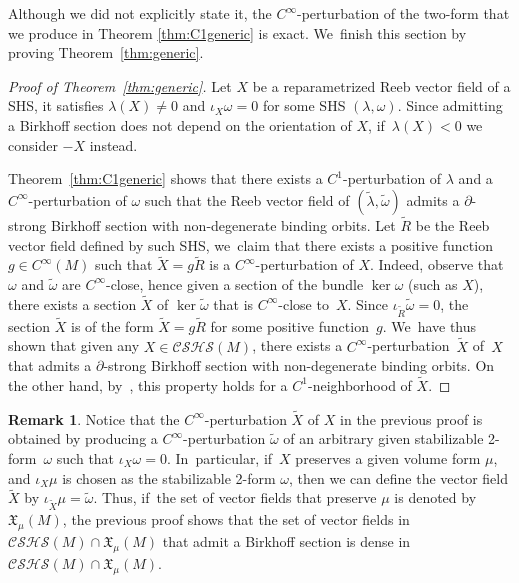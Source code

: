 \documentclass[10pt]{amsart}
\theoremstyle{definition}
\newtheorem{Remark}[theorem]{Remark}
\begin{document}
Although we did not explicitly state it, the $C^\infty$-perturbation of the two-form that we produce in Theorem \ref{thm:C1generic} is exact. We~finish this section by proving Theorem~\ref{thm:generic}.

\begin{proof}[Proof of Theorem~\ref{thm:generic}]
Let $X$ be a reparametrized Reeb vector field of a SHS, \ie it satisfies $\lambda(X)\neq 0$ and $\iota_X\omega=0$ for some SHS $(\lambda,\omega)$. Since admitting a Birkhoff section does not depend on the orientation of $X$, if~$\lambda(X)<0$ we consider $-X$ instead.

Theorem~\ref{thm:C1generic} shows that there exists a $C^1$-perturbation of $\lambda$ and a $C^\infty$-perturba\-tion of $\omega$ such that the Reeb vector field of $(\widetilde \lambda, \widetilde \omega)$ admits a $\partial$-strong Birkhoff section with non-degenerate binding orbits. Let $\widetilde R$ be the Reeb vector field defined by such SHS, we~claim that there exists a positive function $g\in C^\infty(M)$ such that $\widetilde X=g\widetilde R$ is a $C^\infty$\nobreakdash-perturbation of $X$. Indeed, observe that $\omega$ and $\widetilde \omega$ are $C^\infty$-close, hence given a section of the bundle $\ker \omega$ (such as $X$), there exists a section $\widetilde X$ of $\ker \widetilde \omega$ that is $C^\infty$-close to~$X$. Since $\iota_{\widetilde R}\widetilde \omega=0$, the section $\widetilde X$ is of the form $\widetilde X=g\widetilde R$ for some positive function~$g$. We~have thus shown that given any $X\in \mathcal{CSHS}(M)$, there exists a $C^\infty$-perturbation~$\widetilde X$ of~$X$ that admits a $\partial$-strong Birkhoff section with non-degenerate binding orbits. On the other hand, by~\cite[\S 5]{CDHR}, this property holds for a $C^1$-neighborhood of $\widetilde X$.
\end{proof}

\begin{Remark}\label{rem:fixvol}
Notice that the $C^\infty$-perturbation $\widetilde X$ of $X$ in the previous proof is obtained by producing a $C^\infty$-perturbation $\widetilde \omega$ of an arbitrary given stabilizable 2-form~$\omega$ such that $\iota_X\omega=0$. In~particular, if~$X$ preserves a given volume form $\mu$, and $\iota_X\mu$ is chosen as the stabilizable 2-form $\omega$, then we can define the vector field $\widetilde X$ by $\iota_{\widetilde X}\mu=\widetilde \omega$. Thus, if~the set of vector fields that preserve $\mu$ is denoted by $\mathfrak{X}_\mu(M)$, the previous proof shows that the set of vector fields in $\mathcal{CSHS}(M)\cap \mathfrak{X}_\mu(M)$ that admit a Birkhoff section is dense in $\mathcal{CSHS}(M)\cap \mathfrak{X}_\mu(M)$.
\end{Remark}
\end{document}
